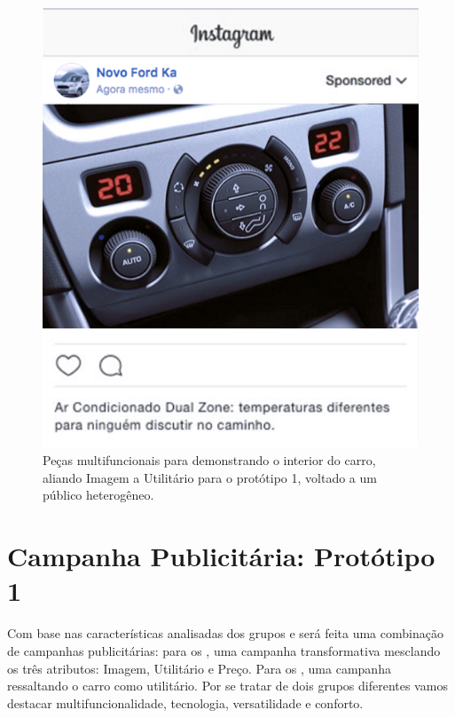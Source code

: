 \begin{figure}
\begin{centering}
{\begin{centering}
\includegraphics[height=0.37\textheight]{Imagens/p1_interior_painel}
\par\end{centering}
}
\par\end{centering}
\caption{Peças multifuncionais para demonstrando o interior do carro, aliando Imagem a Utilitário para o protótipo 1, voltado a um público heterogêneo.}
\end{figure}


\section{Campanha Publicitária: Protótipo 1}

Com base nas características analisadas dos grupos \nomeCa{} e \nomeCd{}
será feita uma combinação de campanhas publicitárias: para os \nomeCa{},
uma campanha transformativa mesclando os três atributos: Imagem, Utilitário
e Preço. Para os \nomeCd{}, uma campanha ressaltando o carro como
utilitário. Por se tratar de dois grupos diferentes vamos destacar
multifuncionalidade, tecnologia, versatilidade e conforto.

